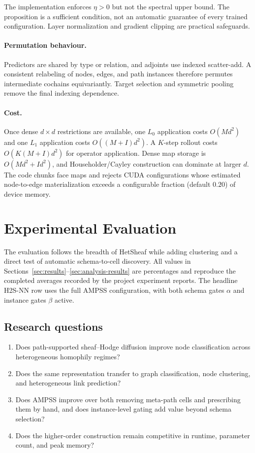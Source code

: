 \documentclass{article}
\newcommand{\method}{\textsc{H2S-NN}}
\newcommand{\ampss}{\textsc{AMPSS}}
\begin{document}
The implementation enforces $\eta>0$ but not the spectral upper bound. The proposition is a
sufficient condition, not an automatic guarantee of every trained configuration. Layer
normalization and gradient clipping are practical safeguards.

\paragraph{Permutation behaviour.}
Predictors are shared by type or relation, and adjoints use indexed scatter-add. A consistent
relabeling of nodes, edges, and path instances therefore permutes intermediate cochains
equivariantly. Target selection and symmetric pooling remove the final indexing dependence.

\paragraph{Cost.}
Once dense $d\times d$ restrictions are available, one $L_0$ application costs $O(Md^2)$ and one
$L_1$ application costs $O((M+I)d^2)$. A $K$-step rollout costs $O(K(M+I)d^2)$ for operator
application. Dense map storage is $O(Md^2+Id^2)$, and Householder/Cayley construction can dominate
at larger $d$. The code chunks face maps and rejects CUDA configurations whose estimated
node-to-edge materialization exceeds a configurable fraction (default $0.20$) of device memory.

\section{Experimental Evaluation}
\label{sec:experiments}

The evaluation follows the breadth of HetSheaf \citep{braithwaite2024hetsheaf} while adding
clustering and a direct test of automatic schema-to-cell discovery. All values in
Sections~\ref{sec:results}--\ref{sec:analysis-results} are percentages and reproduce the completed
averages recorded by the project experiment reports. The headline \method{} row uses the full
\ampss{} configuration, with both schema gates $\alpha$ and instance gates $\beta$ active.

\subsection{Research questions}
\begin{enumerate}
  \item[RQ1.] Does path-supported sheaf--Hodge diffusion improve node classification across
  heterogeneous homophily regimes?
  \item[RQ2.] Does the same representation transfer to graph classification, node clustering, and
  heterogeneous link prediction?
  \item[RQ3.] Does \ampss{} improve over both removing meta-path cells and prescribing them by hand,
  and does instance-level gating add value beyond schema selection?
  \item[RQ4.] Does the higher-order construction remain competitive in runtime, parameter count, and
  peak memory?
\end{enumerate}
\end{document}
